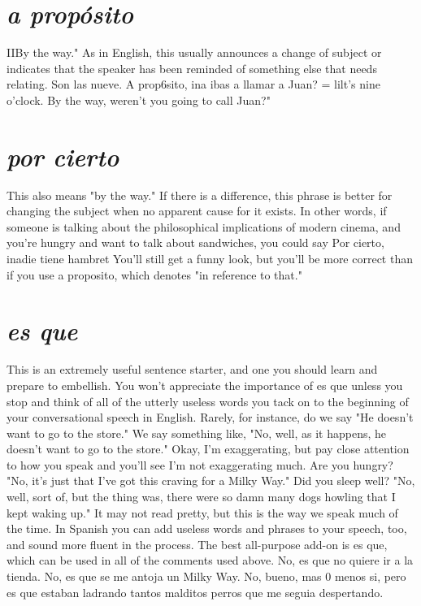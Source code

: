 \documentclass[14pt,a4paper,oneside]{memoir}
\begin{document}
\section{\emph{a propósito}}

IIBy the way." As in English, this usually announces a change
of subject or indicates that the speaker has been reminded of something else that needs relating. Son las nueve. A prop6sito, ina ibas a
llamar a Juan? = lilt's nine o'clock. By the way, weren't you going to
call Juan?"

\section{\emph{por cierto}}

This also means "by the way." If there is a difference, this
phrase is better for changing the subject when no apparent cause for
it exists. In other words, if someone is talking about the philosophical
implications of modern cinema, and you're hungry and want to talk
about sandwiches, you could say Por cierto, inadie tiene hambret
You'll still get a funny look, but you'll be more correct than if you use
a proposito, which denotes "in reference to that."

\section{\emph{es que}}

This is an extremely useful sentence starter, and one you
should learn and prepare to embellish. You won't appreciate the importance of es que unless you stop and think of all of the utterly useless
words you tack on to the beginning of your conversational speech in
English. Rarely, for instance, do we say "He doesn't want to go to the
store." We say something like, "No, well, as it happens, he doesn't
want to go to the store." Okay, I'm exaggerating, but pay close attention to how you speak and you'll see I'm not exaggerating much. Are
you hungry? "No, it's just that I've got this craving for a Milky Way."
Did you sleep well? "No, well, sort of, but the thing was, there were
so damn many dogs howling that I kept waking up." It may not read
pretty, but this is the way we speak much of the time. In Spanish you
can add useless words and phrases to your speech, too, and sound more
fluent in the process. The best all-purpose add-on is es que, which can
be used in all of the comments used above. No, es que no quiere ir a
la tienda. No, es que se me antoja un Milky Way. No, bueno, mas 0
menos si, pero es que estaban ladrando tantos malditos perros que
me seguia despertando.
\end{document}
